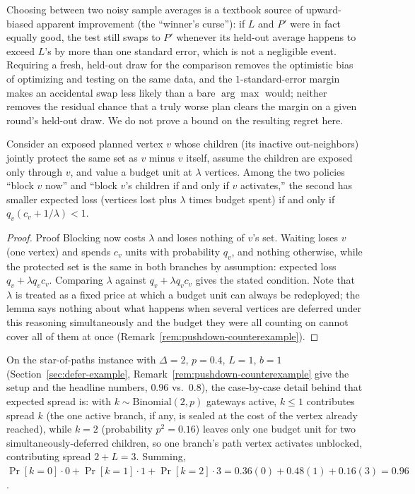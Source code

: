 \documentclass[ijoc,sglanonrev]{informs4}
\begin{document}
\begin{repeatremark}
Choosing between two noisy sample averages is a textbook source of
upward-biased apparent improvement (the ``winner's curse''): if $L$ and
$P'$ were in fact equally good, the test still swaps to $P'$ whenever its
held-out average happens to exceed $L$'s by more than one standard error,
which is not a negligible event. Requiring a fresh, held-out draw for the
comparison removes the optimistic bias of optimizing and testing on the
same data, and the $1$-standard-error margin makes an accidental swap less
likely than a bare $\arg\max$ would; neither removes the residual chance
that a truly worse plan clears the margin on a given round's held-out
draw. We do not prove a bound on the resulting regret here.
\end{repeatremark}

\begin{repeatlemma}
Consider an exposed planned vertex $v$ whose children (its inactive
out-neighbors) jointly protect the same set as $v$ minus $v$ itself, assume
the children are exposed only through $v$, and value a budget unit at
$\lambda$ vertices. Among the two policies ``block $v$ now'' and ``block
$v$'s children if and only if $v$ activates,'' the second has smaller
expected loss (vertices lost plus $\lambda$ times budget spent) if and only
if $q_v(c_v+1/\lambda)<1$.
\end{repeatlemma}
\begin{proof}{Proof}
Blocking now costs $\lambda$ and loses nothing of $v$'s set. Waiting loses
$v$ (one vertex) and spends $c_v$ units with probability $q_v$, and nothing
otherwise, while the protected set is the same in both branches by
assumption: expected loss $q_v+\lambda q_v c_v$. Comparing $\lambda$ against
$q_v+\lambda q_v c_v$ gives the stated condition. Note that $\lambda$ is
treated as a fixed price at which a budget unit can always be redeployed;
the lemma says nothing about what happens when several vertices are
deferred under this reasoning simultaneously and the budget they were all
counting on cannot cover all of them at once
(Remark~\ref{rem:pushdown-counterexample}).\Halmos
\end{proof}

\begin{repeatremark}
On the star-of-paths instance with $\Delta=2$, $p=0.4$, $L=1$, $b=1$
(Section~\ref{sec:defer-example}, Remark~\ref{rem:pushdown-counterexample}
give the setup and the headline numbers, $0.96$ vs.\ $0.8$), the
case-by-case detail behind that expected spread is: with
$k\sim\mathrm{Binomial}(2,p)$ gateways active, $k\le1$ contributes spread
$k$ (the one active branch, if any, is sealed at the cost of the vertex
already reached), while $k=2$ (probability $p^2=0.16$) leaves only one
budget unit for two simultaneously-deferred children, so one branch's
path vertex activates unblocked, contributing spread $2+L=3$. Summing,
$\Pr[k{=}0]\cdot0+\Pr[k{=}1]\cdot1+\Pr[k{=}2]\cdot3=0.36(0)+0.48(1)+0.16(3)=0.96$.
\end{repeatremark}
\end{document}
